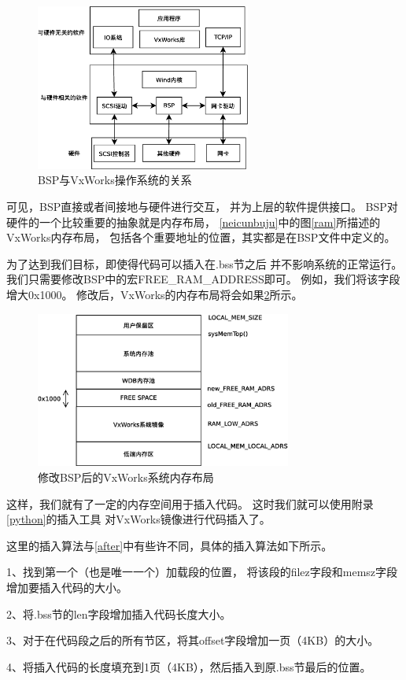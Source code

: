 \begin{figure}[h!]
    \centering
    \includegraphics[width=0.63\textwidth]{figure/bsp.eps}
    \caption{BSP与VxWorks操作系统的关系}
    \label{bsp}
\end{figure}


可见，BSP直接或者间接地与硬件进行交互，
并为上层的软件提供接口。
BSP对硬件的一个比较重要的抽象就是内存布局，
\ref{neicunbuju}中的图\ref{ram}所描述的VxWorks内存布局，
包括各个重要地址的位置，其实都是在BSP文件中定义的。

为了达到我们目标，即使得代码可以插入在.bss节之后
并不影响系统的正常运行。
我们只需要修改BSP中的宏FREE\_RAM\_ADDRESS即可。
例如，我们将该字段增大0x1000。
修改后，VxWorks的内存布局将会如果\ref{ram2}所示。

\begin{figure}[h!]
    \centering
    \includegraphics[width=0.75\textwidth]{figure/ram2.eps}
    \caption{修改BSP后的VxWorks系统内存布局}
    \label{ram2}
\end{figure}

这样，我们就有了一定的内存空间用于插入代码。
这时我们就可以使用附录\ref{python}的插入工具
对VxWorks镜像进行代码插入了。

这里的插入算法与\ref{after}中有些许不同，具体的插入算法如下所示。

1、找到第一个（也是唯一一个）加载段的位置，
将该段的filez字段和memsz字段增加要插入代码的大小。

2、将.bss节的len字段增加插入代码长度大小。

3、对于在代码段之后的所有节区，将其offset字段增加一页（4KB）的大小。

4、将插入代码的长度填充到1页（4KB），然后插入到原.bss节最后的位置。


























